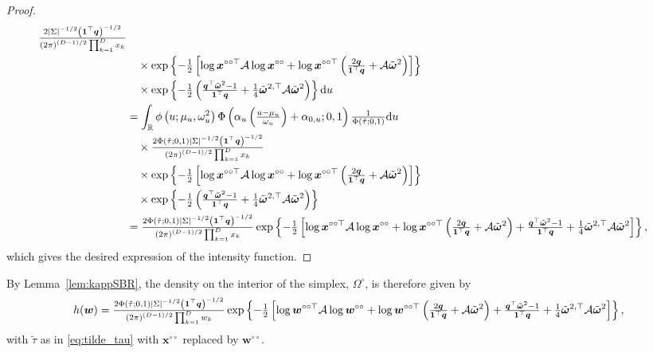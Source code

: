 \documentclass[lineno]{biometrika}
\begin{document}
\begin{proof}
\begin{align*}
{\textstyle{2| \Sigma |^{-1/2} \left( \bm 1^\top \bm q\right)^{-1/2}\over\left( 2\pi \right)^{(D-1)/2}\prod_{k=1}^Dx_k}} \\
&\quad \times \exp \left\{ -{\textstyle{1\over2}} \left[ \log \bm x^{\circ\circ\top} \mathcal{A} \log \bm x^{\circ\circ} + \log \bm x^{\circ\circ\top} \left( {\textstyle{2 \bm q\over\bm 1^\top \bm q}} + {\mathcal A}\tilde{\bm\omega}^2\right) \right]\right\} \\
& \quad \times \exp \left\{- {\textstyle{1\over2}} \left( {\textstyle{\bm q^\top\tilde{\bm \omega}^2 - 1\over\bm 1 ^\top \bm q}} + {\textstyle{1\over4}}\tilde{\bm\omega}^{2,\top}{\mathcal A}\tilde{\bm\omega}^2\right) \right\} \text du   \\
&=  \int_{\mathbb R} \phi \left( u; \mu_u, \omega_u^2 \right) \Phi\left( \alpha_u\left({\textstyle{u-\mu_u\over\omega_u}}\right) + \alpha_{0,u};0,1\right){\textstyle{1\over\Phi(\tilde{\tau};0,1)}} \text du \\
&\quad\times {\textstyle{2\Phi(\tilde{\tau};0,1)| \Sigma |^{-1/2} \left( \bm 1^\top \bm q\right)^{-1/2}\over\left( 2\pi \right)^{(D-1)/2}\prod_{k=1}^Dx_k}} \\
&\quad \times \exp \left\{ -{\textstyle{1\over2}} \left[ \log \bm x^{\circ\circ\top} \mathcal{A} \log \bm x^{\circ\circ} + \log \bm x^{\circ\circ\top} \left( {\textstyle{2 \bm q\over\bm 1^\top \bm q}} + {\mathcal A}\tilde{\bm\omega}^2\right) \right]\right\} \\
& \quad \times \exp \left\{- {\textstyle{1\over2}} \left( {\textstyle{\bm q^\top\tilde{\bm \omega}^2 - 1\over\bm 1 ^\top \bm q}} + {\textstyle{1\over4}}\tilde{\bm\omega}^{2,\top}{\mathcal A}\tilde{\bm\omega}^2\right) \right\} \\
&={\textstyle{2\Phi(\tilde{\tau};0,1)| \Sigma |^{-1/2} \left( \bm 1^\top \bm q\right)^{-1/2}\over\left( 2\pi \right)^{(D-1)/2}\prod_{k=1}^Dx_k}}\exp \left\{ -{\textstyle{1\over2}} \left[ \log \bm x^{\circ\circ\top} \mathcal{A} \log \bm x^{\circ\circ} + \log \bm x^{\circ\circ\top} \left( {\textstyle{2 \bm q\over\bm 1^\top \bm q}}+{\mathcal A}\tilde{\bm\omega}^2\right) + {\textstyle{\bm q^\top\tilde{\bm \omega}^2 - 1\over\bm 1 ^\top \bm q }} + {\textstyle{1\over4}}\tilde{\bm\omega}^{2,\top}{\mathcal A}\tilde{\bm\omega}^2 \right]\right\},
\end{align*}
which gives the desired expression of the intensity function. 
% 
\end{proof}

By Lemma~\ref{lem:kappSBR}, the density on the interior of the simplex, $\Omega^\circ$, is therefore given by
%
$$
h(\bm w) ={\textstyle{2\Phi(\tilde{\tau};0,1)| \Sigma |^{-1/2} \left( \bm 1^\top \bm q\right)^{-1/2}\over\left( 2\pi \right)^{(D-1)/2}\prod_{k=1}^D w_k}}\exp \left\{ -{\textstyle{1\over2}} \left[ \log \bm w^{\circ\circ\top} \mathcal{A} \log \bm w^{\circ\circ} + \log \bm w^{\circ\circ\top} \left( {\textstyle{2 \bm q\over\bm 1^\top \bm q}} + {\mathcal A}\tilde{\bm\omega}^2\right) + {\textstyle{\bm q^\top\tilde{\bm \omega}^2 - 1\over\bm 1 ^\top \bm q}} + {\textstyle{1\over4}}\tilde{\bm\omega}^{2,\top}{\mathcal A}\tilde{\bm\omega}^2 \right]\right\},
$$
with $\tilde{\tau}$ as in \eqref{eq:tilde_tau} with $\bm x^{\circ\circ}$ replaced by $\bm w^{\circ\circ}$.
\end{document}
